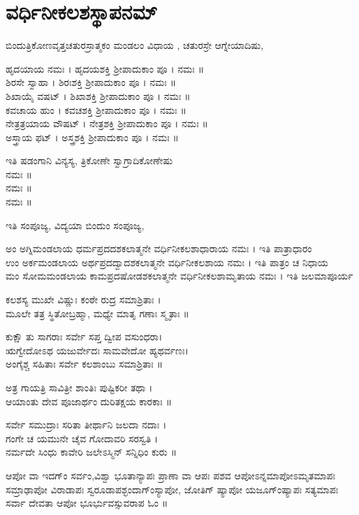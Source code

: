 \section{ವರ್ಧಿನೀಕಲಶಸ್ಥಾಪನಮ್}
ಬಿಂದುತ್ರಿಕೋಣವೃತ್ತಚತುರಸ್ರಾತ್ಮಕಂ ಮಂಡಲಂ ವಿಧಾಯ , ಚತುರಸ್ರೇ ಆಗ್ನೇಯಾದಿಷು,

 ಹೃದಯಾಯ ನಮಃ । ಹೃದಯಶಕ್ತಿ ಶ್ರೀಪಾದುಕಾಂ ಪೂ । ನಮಃ ॥\\
 ಶಿರಸೇ ಸ್ವಾಹಾ । ಶಿರಃಶಕ್ತಿ ಶ್ರೀಪಾದುಕಾಂ ಪೂ । ನಮಃ ॥\\
 ಶಿಖಾಯೈ ವಷಟ್ । ಶಿಖಾಶಕ್ತಿ ಶ್ರೀಪಾದುಕಾಂ ಪೂ । ನಮಃ ॥\\
 ಕವಚಾಯ ಹುಂ । ಕವಚಶಕ್ತಿ ಶ್ರೀಪಾದುಕಾಂ ಪೂ । ನಮಃ ॥\\
 ನೇತ್ರತ್ರಯಾಯ ವೌಷಟ್ । ನೇತ್ರಶಕ್ತಿ ಶ್ರೀಪಾದುಕಾಂ ಪೂ । ನಮಃ ॥\\
 ಅಸ್ತ್ರಾಯ ಫಟ್ । ಅಸ್ತ್ರಶಕ್ತಿ ಶ್ರೀಪಾದುಕಾಂ ಪೂ । ನಮಃ ॥ 

ಇತಿ ಷಡಂಗಾನಿ ವಿನ್ಯಸ್ಯ, ತ್ರಿಕೋಣೇ ಸ್ವಾಗ್ರಾದಿಕೋಣೇಷು\\
 ನಮಃ ॥\\
 ನಮಃ ॥\\
 ನಮಃ ॥

ಇತಿ ಸಂಪೂಜ್ಯ, ವಿದ್ಯಯಾ ಬಿಂದುಂ ಸಂಪೂಜ್ಯ,

 ಅಂ ಅಗ್ನಿಮಂಡಲಾಯ ಧರ್ಮಪ್ರದದಶಕಲಾತ್ಮನೇ ವರ್ಧಿನೀಕಲಶಾಧಾರಾಯ ನಮಃ । ಇತಿ ಪಾತ್ರಾಧಾರಂ\\
 ಉಂ ಅರ್ಕಮಂಡಲಾಯ ಅರ್ಥಪ್ರದದ್ವಾದಶಕಲಾತ್ಮನೇ ವರ್ಧಿನೀಕಲಶಾಯ ನಮಃ । ಇತಿ ಪಾತ್ರಂ ಚ ನಿಧಾಯ\\
 ಮಂ ಸೋಮಮಂಡಲಾಯ ಕಾಮಪ್ರದಷೋಡಶಕಲಾತ್ಮನೇ ವರ್ಧಿನೀಕಲಶಾಮೃತಾಯ ನಮಃ । ಇತಿ ಜಲಮಾಪೂರ್ಯ

ಕಲಶಸ್ಯ ಮುಖೇ ವಿಷ್ಣುಃ ಕಂಠೇ ರುದ್ರ ಸಮಾಶ್ರಿತಾಃ  ।\\
ಮೂಲೇ ತತ್ರ ಸ್ಥಿತೋಬ್ರಹ್ಮಾ, ಮಧ್ಯೇ ಮಾತೃ ಗಣಾಃ ಸ್ಮೃತಾಃ ॥

ಕುಕ್ಷೌ ತು ಸಾಗರಾಃ ಸರ್ವೇ ಸಪ್ತ ದ್ವೀಪ ವಸುಂಧರಾ।\\
ಋಗ್ವೇದೋಽಥ ಯಜುರ್ವೇದಃ ಸಾಮವೇದೋ ಹ್ಯಥರ್ವಣಃ।\\
ಅಂಗೈಶ್ಚ ಸಹಿತಾಃ ಸರ್ವೇ ಕಲಶಾಂಬು ಸಮಾಶ್ರಿತಾಃ ॥

ಅತ್ರ ಗಾಯತ್ರಿ ಸಾವಿತ್ರೀ ಶಾಂತಿಃ ಪುಷ್ಟಿಕರೀ ತಥಾ ।\\
ಆಯಾಂತು ದೇವ ಪೂಜಾರ್ಥಂ ದುರಿತಕ್ಷಯ ಕಾರಕಾಃ ॥

ಸರ್ವೇ ಸಮುದ್ರಾಃ ಸರಿತಾ ತೀರ್ಥಾನಿ ಜಲದಾ ನದಾಃ ।\\
ಗಂಗೇ ಚ ಯಮುನೇ ಚೈವ ಗೋದಾವರಿ ಸರಸ್ವತಿ ।\\
ನರ್ಮದೇ ಸಿಂಧು ಕಾವೇರಿ ಜಲೇಽಸ್ಮಿನ್ ಸನ್ನಿಧಿಂ ಕುರು ॥

ಆಪೋ ವಾ ಇದಗ್ಂ ಸರ್ವಂ,ವಿಶ್ವಾ ಭೂತಾನ್ಯಾಪಃ ಪ್ರಾಣಾ ವಾ ಆಪಃ ಪಶವ ಆಪೋಽನ್ನಮಾಪೋಽಮೃತಮಾಪಃ ಸಮ್ರಾಢಾಪೋ ವಿರಾಡಾಪಃ ಸ್ವರೂಡಾಪಶ್ಛಂದಾಗ್ಂಸ್ಯಾಪೋ, ಜೋತಿಗ್ ಷ್ಯಾಪೋ ಯಜೂಗ್ಂಷ್ಯಾಪಃ ಸತ್ಯಮಾಪಃ ಸರ್ವಾ ದೇವತಾ ಆಪೋ ಭೂರ್ಭುವಸ್ಸುವರಾಪ ಓಂ ॥

